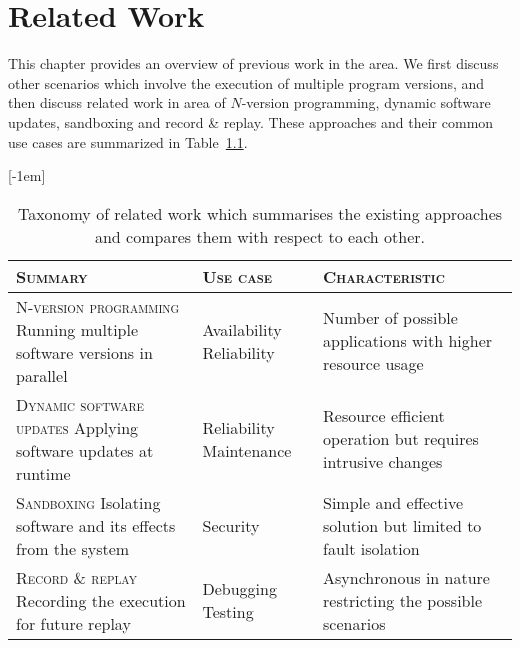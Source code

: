 \chapter{Related Work}
\label{chap:related}

This chapter provides an overview of previous work in the area.  We first
discuss other scenarios which involve the execution of multiple program
versions, and then discuss related work in area of $N$-version programming,
dynamic software updates, sandboxing and record \& replay. These approaches
and their common use cases are summarized in Table~\ref{tbl:taxonomy}.

\begin{table}[!h]
\begin{center}
\caption{Taxonomy of related work which summarises the existing approaches
and compares them with respect to each other.}
\label{tbl:taxonomy}[-1em]
\begin{tabularx}{\textwidth}{>{\hsize=1.5\hsize}X>{\hsize=0.5\hsize}X>{\hsize=1.0\hsize}X}
\toprule
\textsc{Summary} & \textsc{Use case} & \textsc{Characteristic} \\
\midrule
\textsc{N-version programming} \newline Running multiple software versions in parallel & Availability \newline Reliability & Number of possible applications with higher resource usage \\
\midrule
\textsc{Dynamic software updates} \newline Applying software updates at runtime & Reliability \newline Maintenance & Resource efficient operation but requires intrusive changes \\
\midrule
\textsc{Sandboxing} \newline Isolating software and its effects from the system & Security & Simple and effective solution but limited to fault isolation \\
\midrule
\textsc{Record \& replay} \newline Recording the execution for future replay & Debugging \newline Testing & Asynchronous in nature restricting the possible scenarios \\
\bottomrule
\end{tabularx}
\end{center}
\end{table}

